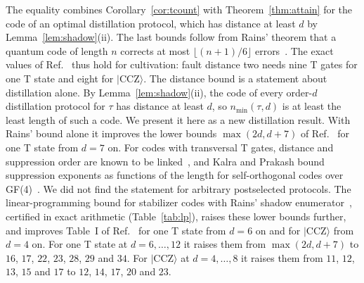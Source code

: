 \documentclass[aps,prl,reprint,twocolumn,amsmath,amssymb,floatfix,nofootinbib,superscriptaddress]{revtex4-2}
\theoremstyle{definition}
\theoremstyle{remark}
\newcommand{\CCZ}{\mathrm{CCZ}}
\begin{document}
The equality combines Corollary~\ref{cor:tcount} with Theorem~\ref{thm:attain} for the code of an optimal distillation protocol, which has distance at least $d$ by Lemma~\ref{lem:shadow}(ii). The last bounds follow from Rains' theorem that a quantum code of length $n$ corrects at most $\lfloor(n+1)/6\rfloor$ errors~\cite{rains}. The exact values of Ref.~\cite{distillationpaper} thus hold for cultivation: fault distance two needs nine T gates for one T state and eight for $|\CCZ\rangle$. The distance bound is a statement about distillation alone. By Lemma~\ref{lem:shadow}(ii), the code of every order-$d$ distillation protocol for $\tau$ has distance at least $d$, so $n_{\min}(\tau,d)$ is at least the least length of such a code. We present it here as a new distillation result. With Rains' bound alone it improves the lower bounds $\max(2d,d+7)$ of Ref.~\cite{distillationpaper} for one T state from $d=7$ on. For codes with transversal T gates, distance and suppression order are known to be linked~\cite{bravyihaah}, and Kalra and Prakash bound suppression exponents as functions of the length for self-orthogonal codes over GF(4)~\cite{kalraprakash}. We did not find the statement for arbitrary postselected protocols. The linear-programming bound for stabilizer codes with Rains' shadow enumerator~\cite{shorlaflamme,rains}, certified in exact arithmetic (Table~\ref{tab:lp}), raises these lower bounds further, and improves Table~I of Ref.~\cite{distillationpaper} for one T state from $d=6$ on and for $|\CCZ\rangle$ from $d=4$ on. For one T state at $d=6,\dots,12$ it raises them from $\max(2d,d+7)$ to $16$, $17$, $22$, $23$, $28$, $29$ and $34$. For $|\CCZ\rangle$ at $d=4,\dots,8$ it raises them from $11$, $12$, $13$, $15$ and $17$ to $12$, $14$, $17$, $20$ and $23$.
\end{document}
